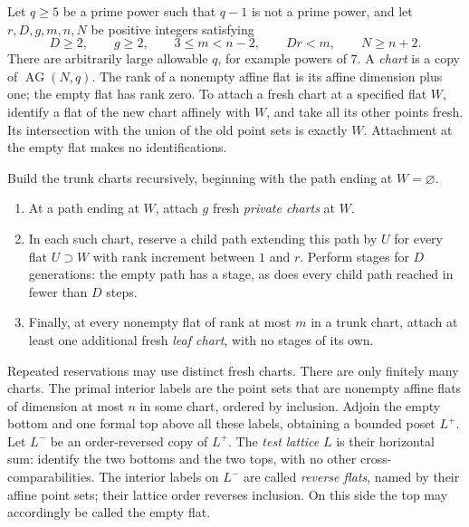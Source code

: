 \begin{definition}\label{f:def-test-lattice}
Let $q\ge5$ be a prime power such that $q-1$ is not a prime power, and let
$r,D,g,m,n,N$ be positive integers satisfying
\begin{equation}\label{f:eq-parameters}
 D\ge2,\qquad g\ge2,\qquad 3\le m<n-2,\qquad Dr<m,\qquad N\ge n+2.
\end{equation}
There are arbitrarily large allowable $q$, for example powers of $7$.
A \emph{chart} is a copy of $\operatorname{AG}(N,q)$. The rank of a nonempty
affine flat is its affine dimension plus one; the empty flat has rank zero.
To attach a fresh chart at a specified flat $W$, identify a flat of the new
chart affinely with $W$, and take all its other points fresh. Its intersection
with the union of the old point sets is exactly $W$. Attachment at the empty
flat makes no identifications.

Build the trunk charts recursively, beginning with the path ending at
$W=\varnothing$.
\begin{enumerate}[label=\textup{(\roman*)}]
\item At a path ending at $W$, attach $g$ fresh \emph{private charts} at $W$.
\item In each such chart, reserve a child path extending this path by $U$
for every flat $U\supset W$ with rank increment between $1$ and $r$.
Perform stages for $D$ generations: the empty path has a stage, as does
every child path reached in fewer than $D$ steps.
\item Finally, at every nonempty flat of rank at most $m$ in a trunk chart,
attach at least one additional fresh \emph{leaf chart}, with no stages of
its own.
\end{enumerate}
Repeated reservations may use distinct fresh charts. There are only finitely
many charts. The primal interior labels are the point sets that are
nonempty affine flats of dimension at most $n$ in some chart, ordered by
inclusion. Adjoin the empty bottom and one formal top above all these
labels, obtaining a bounded poset $L^+$. Let $L^-$ be an order-reversed copy
of $L^+$. The \emph{test lattice} $L$ is their horizontal sum: identify the
two bottoms and the two tops, with no other cross-comparabilities.
The interior labels on $L^-$ are called \emph{reverse flats}, named by their
affine point sets; their lattice order reverses inclusion. On this side the
top may accordingly be called the empty flat.
\end{definition}

